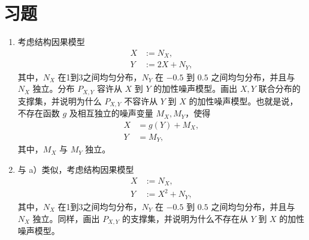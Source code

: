\FloatBarrier
\section{习题}
\setcounter{problem}{14}
\begin{problem}[加性噪声模型]
\begin{enumerate}[label=\alph*)]
 \item 考虑结构因果模型
 \[
  \begin{aligned}
   X&:=N_X,\\
   Y&:=2X+N_Y,
  \end{aligned}
 \]
 其中，$N_X$ 在1到3之间均匀分布，$N_Y$ 在 $-0.5$ 到 $0.5$ 之间均匀分布，并且与 $N_X$ 独立。分布 $P_{X,Y}$ 容许从 $X$ 到 $Y$ 的加性噪声模型。画出 $X,Y$ 联合分布的支撑集，并说明为什么 $P_{X,Y}$ 不容许从 $Y$ 到 $X$ 的加性噪声模型。也就是说，不存在函数 $g$ 及相互独立的噪声变量 $M_X,M_Y$，使得
 \[
  \begin{aligned}
   X&=g(Y)+M_X,\\
   Y&=M_Y,
  \end{aligned}
 \]
 其中，$M_X$ 与 $M_Y$ 独立。
 \item 与 a）类似，考虑结构因果模型
 \[
  \begin{aligned}
   X&:=N_X,\\
   Y&:=X^2+N_Y,
  \end{aligned}
 \]
 其中，$N_X$ 在1到3之间均匀分布，$N_Y$ 在 $-0.5$ 到 $0.5$ 之间均匀分布，并且与 $N_X$ 独立。同样，画出 $P_{X,Y}$ 的支撑集，并说明为什么不存在从 $Y$ 到 $X$ 的加性噪声模型。
\end{enumerate}
\end{problem}

